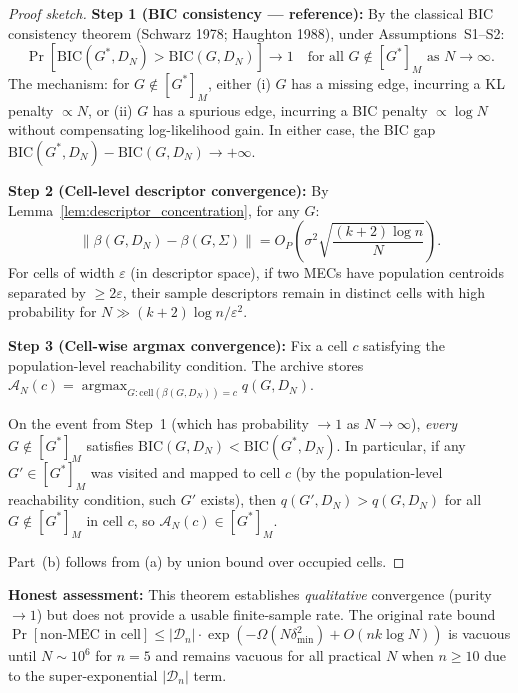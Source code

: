 \documentclass{article}
\theoremstyle{definition}
\theoremstyle{plain}
\theoremstyle{remark}
\DeclareMathOperator*{\argmax}{argmax}
\begin{document}
\begin{proof}[Proof sketch]
\textbf{Step 1 (BIC consistency — reference):} By the classical BIC consistency
theorem (Schwarz 1978; Haughton 1988), under Assumptions~S1--S2:
\begin{equation}
\Pr\!\left[\mathrm{BIC}(G^*, D_N) > \mathrm{BIC}(G, D_N)\right] \to 1
\quad \text{for all } G \notin [G^*]_M \text{ as } N \to \infty. \tag{$\star$}
\end{equation}
The mechanism: for $G \notin [G^*]_M$, either (i) $G$ has a missing edge, incurring
a KL penalty $\propto N$, or (ii) $G$ has a spurious edge, incurring a BIC penalty
$\propto \log N$ without compensating log-likelihood gain. In either case, the
BIC gap $\mathrm{BIC}(G^*, D_N) - \mathrm{BIC}(G, D_N) \to +\infty$.

\textbf{Step 2 (Cell-level descriptor convergence):} By Lemma~\ref{lem:descriptor_concentration},
for any $G$:
\begin{equation}
\|\beta(G, D_N) - \beta(G, \Sigma)\| = O_P\!\left(\sigma^2\sqrt{\frac{(k+2)\log n}{N}}\right).
\end{equation}
For cells of width $\varepsilon$ (in descriptor space), if two MECs have population
centroids separated by $\geq 2\varepsilon$, their sample descriptors remain in
distinct cells with high probability for $N \gg (k+2)\log n / \varepsilon^2$.

\textbf{Step 3 (Cell-wise argmax convergence):} Fix a cell $c$ satisfying the
population-level reachability condition. The archive stores
$\mathcal{A}_N(c) = \argmax_{G: \text{cell}(\beta(G,D_N))=c} q(G, D_N)$.

On the event from Step~1 (which has probability $\to 1$ as $N \to \infty$),
\emph{every} $G \notin [G^*]_M$ satisfies $\mathrm{BIC}(G, D_N) < \mathrm{BIC}(G^*, D_N)$.
In particular, if any $G' \in [G^*]_M$ was visited and mapped to cell $c$ (by the
population-level reachability condition, such $G'$ exists), then $q(G', D_N) > q(G, D_N)$
for all $G \notin [G^*]_M$ in cell $c$, so $\mathcal{A}_N(c) \in [G^*]_M$.

Part~(b) follows from (a) by union bound over occupied cells.
\end{proof}

\textbf{Honest assessment:} This theorem establishes \emph{qualitative} convergence
(purity $\to 1$) but does not provide a usable finite-sample rate. The original
rate bound $\Pr[\text{non-MEC in cell}] \leq |\mathcal{D}_n| \cdot \exp(-\Omega(N \delta_{\min}^2) + O(n k \log N))$
is vacuous until $N \sim 10^6$ for $n=5$ and remains vacuous for all practical $N$
when $n \geq 10$ due to the super-exponential $|\mathcal{D}_n|$ term.
\end{document}
